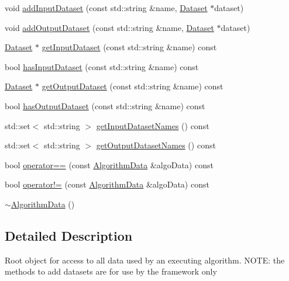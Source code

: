 \begin{DoxyCompactItemize}
void \hyperlink{classBUSBOY_1_1AlgorithmData_a23f52c3ffb2d7f2806014f862449b813}{addInputDataset} (const std::string \&name, \hyperlink{classBUSBOY_1_1Dataset}{Dataset} $\ast$dataset)
\item 
void \hyperlink{classBUSBOY_1_1AlgorithmData_affca1d960445e7bb5b05b7e4878ccaf9}{addOutputDataset} (const std::string \&name, \hyperlink{classBUSBOY_1_1Dataset}{Dataset} $\ast$dataset)
\item 
\hyperlink{classBUSBOY_1_1Dataset}{Dataset} $\ast$ \hyperlink{classBUSBOY_1_1AlgorithmData_a43a66590e61d6221cd19f20975129b28}{getInputDataset} (const std::string \&name) const 
\item 
bool \hyperlink{classBUSBOY_1_1AlgorithmData_a26f8d2f506f315856870c83397974e86}{hasInputDataset} (const std::string \&name) const 
\item 
\hyperlink{classBUSBOY_1_1Dataset}{Dataset} $\ast$ \hyperlink{classBUSBOY_1_1AlgorithmData_a56c797c91372f44e9c6b2c94c63809d5}{getOutputDataset} (const std::string \&name) const 
\item 
bool \hyperlink{classBUSBOY_1_1AlgorithmData_a3c6fb3cbbedff5f3ac838aec02512968}{hasOutputDataset} (const std::string \&name) const 
\item 
std::set$<$ std::string $>$ \hyperlink{classBUSBOY_1_1AlgorithmData_adaed0664b95cdf0402ed974200e75f17}{getInputDatasetNames} () const 
\item 
std::set$<$ std::string $>$ \hyperlink{classBUSBOY_1_1AlgorithmData_a666c188ae0cc5504d2ef4ee4f460d56f}{getOutputDatasetNames} () const 
\item 
bool \hyperlink{classBUSBOY_1_1AlgorithmData_ac8216a5e7dd52ee678d0990833b9e318}{operator==} (const \hyperlink{classBUSBOY_1_1AlgorithmData}{AlgorithmData} \&algoData) const 
\item 
bool \hyperlink{classBUSBOY_1_1AlgorithmData_ac2fdf18f7ab43dcbaca7cb8c7e69c529}{operator!=} (const \hyperlink{classBUSBOY_1_1AlgorithmData}{AlgorithmData} \&algoData) const 
\item 
\hyperlink{classBUSBOY_1_1AlgorithmData_ab00dea885e7bd25b979fc023c29ddbc2}{$\sim$AlgorithmData} ()
\end{DoxyCompactItemize}


\subsection{Detailed Description}
Root object for access to all data used by an executing algorithm. NOTE: the methods to add datasets are for use by the framework only 

